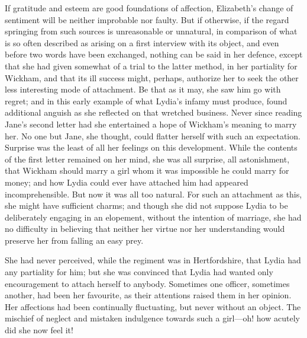 \documentclass[12pt]{book}
\begin{document}
If gratitude and esteem are good foundations of affection, Elizabeth's change of sentiment will be neither improbable nor faulty. But if otherwise, if the regard springing from such sources is unreasonable or unnatural, in comparison of what is so often described as arising on a first interview with its object, and even before two words have been exchanged, nothing can be said in her defence, except that she had given somewhat of a trial to the latter method, in her partiality for Wickham, and that its ill success might, perhaps, authorize her to seek the other less interesting mode of attachment. Be that as it may, she saw him go with regret; and in this early example of what Lydia's infamy must produce, found additional anguish as she reflected on that wretched business. Never since reading Jane's second letter had she entertained a hope of Wickham's meaning to marry her. No one but Jane, she thought, could flatter herself with such an expectation. Surprise was the least of all her feelings on this development. While the contents of the first letter remained on her mind, she was all surprise, all astonishment, that Wickham should marry a girl whom it was impossible he could marry for money; and how Lydia could ever have attached him had appeared incomprehensible. But now it was all too natural. For such an attachment as this, she might have sufficient charms; and though she did not suppose Lydia to be deliberately engaging in an elopement, without the intention of marriage, she had no difficulty in believing that neither her virtue nor her understanding would preserve her from falling an easy prey.

She had never perceived, while the regiment was in Hertfordshire, that Lydia had any partiality for him; but she was convinced that Lydia had wanted only encouragement to attach herself to anybody. Sometimes one officer, sometimes another, had been her favourite, as their attentions raised them in her opinion. Her affections had been continually fluctuating, but never without an object. The mischief of neglect and mistaken indulgence towards such a girl---oh! how acutely did she now feel it!
\end{document}

